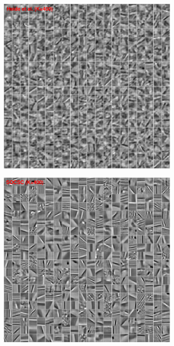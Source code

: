\documentclass[10pt,twocolumn,letterpaper]{article}
\begin{document}
\begin{figure}[h]
\centering
  \begin{subfigure}{0.5\textwidth}
  \includegraphics[width=1\linewidth]{figure/heide400-supple.pdf}
  \end{subfigure}
  \vspace{0.2cm}
  \begin{subfigure}{0.5\textwidth}
  \includegraphics[width=1\linewidth]{figure/online400-supple.pdf}
  \end{subfigure}
  \vspace{0.2cm}


\end{figure}
\end{document}
